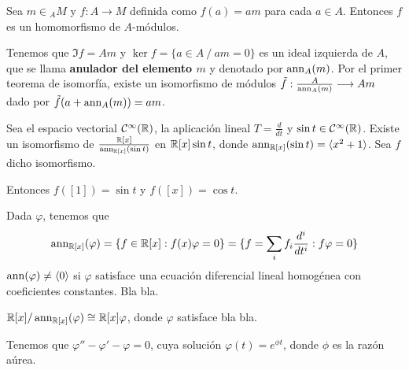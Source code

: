 \begin{ejemplo}
  Sea \(m \in {}_AM\) y \(f: A \longrightarrow M\) definida como \(f(a) = am\) para cada
  \(a \in A\). Entonces \(f\) es un homomorfismo de \(A\)-módulos.

  Tenemos que \(\Im f = Am\) y
  \(\ker f=\{ a \in A \ / \ am=0 \}\) es un ideal izquierda de \(A\), que se llama
  \textbf{anulador del elemento \(m\)} y denotado por \(\operatorname{ann}_A(m)\). Por el primer
  teorema de isomorfía, existe un isomorfismo de módulos \(\tilde{f}: \frac{A}
  {\operatorname{ann}_A(m)} \longrightarrow Am\) dado por \(\tilde{f}(a + \operatorname{ann}_A(m)) = am\). 
\end{ejemplo}

\begin{ejemplo}
  Sea el espacio vectorial \(\mathcal{C}^\infty(\mathbb{R})\), la aplicación lineal
  \(T = \frac{d}{dt}\) y \(\sin t \in \mathcal{C}^\infty(\mathbb{R})\). Existe un isomorfismo
  de \(\frac{\mathbb{R}[x]}{\operatorname{ann}_{\mathbb{R}[x]}(\sin t)}\) en \(\mathbb{R}[x]\sin t\), donde
  \(\operatorname{ann}_{\mathbb{R}[x]}(\sin t) = \langle x^2 + 1 \rangle\). Sea \(f\) dicho isomorfismo.

  Entonces \(f([1]) = \sin t\) y \(f([x]) = \cos t\).

  Dada \(\varphi\),
  tenemos que
  \[
    \operatorname{ann}_{\mathbb{R}[x]}(\varphi)=\{f\in\mathbb{R}[x]: f(x)\varphi=0\}
    =\{f=\sum_i f_i\frac{d^i}{dt^i}: f\varphi=0\}
  \]
  \(\operatorname{ann}(\varphi)\neq\langle 0\rangle\) si \(\varphi\) satisface una ecuación
  diferencial lineal homogénea con coeficientes constantes. Bla bla.

  \(\mathbb{R}[x]/\operatorname{ann}_{\mathbb{R}[x]}(\varphi)\cong \mathbb{R}[x]\varphi\), donde \(\varphi\)
  satisface bla bla.

  Tenemos que \(\varphi''-\varphi'-\varphi=0\), cuya solución
  \(\varphi(t)=e^{\phi t}\), donde \(\phi\) es la razón aúrea.
\end{ejemplo}
  
